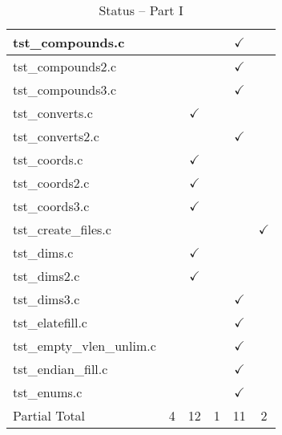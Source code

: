 \begin{table}[H]
\begin{tabular}{|l|c|c|c|c|c|}
tst\_compounds.c        &               &               &               & $\checkmark$  &               \\ \hline
tst\_compounds2.c       &               &               &               & $\checkmark$  &               \\ \hline
tst\_compounds3.c       &               &               &               & $\checkmark$  &               \\ \hline
tst\_converts.c         &               & $\checkmark$  &               &               &               \\ \hline
tst\_converts2.c        &               &               &               & $\checkmark$  &               \\ \hline
tst\_coords.c           &               & $\checkmark$  &               &               &               \\ \hline
tst\_coords2.c          &               & $\checkmark$  &               &               &               \\ \hline
tst\_coords3.c          &               & $\checkmark$  &               &               &               \\ \hline
tst\_create\_files.c    &               &               &               &               & $\checkmark$  \\ \hline
tst\_dims.c             &               & $\checkmark$  &               &               &               \\ \hline
tst\_dims2.c            &               & $\checkmark$  &               &               &               \\ \hline
tst\_dims3.c            &               &               &               & $\checkmark$  &               \\ \hline
tst\_elatefill.c        &               &               &               & $\checkmark$  &               \\ \hline
tst\_empty\_vlen\_unlim.c   &           &               &               & $\checkmark$  &               \\ \hline
tst\_endian\_fill.c     &               &               &               & $\checkmark$  &               \\ \hline
tst\_enums.c            &               &               &               & $\checkmark$  &               \\ \hline
Partial Total           &     4         &       12      &       1       &       11      &       2       \\ \hline
\hline
\end{tabular}
\caption{\label{tab:nc_test4_status_1} Status -- Part I}
\end{table}

